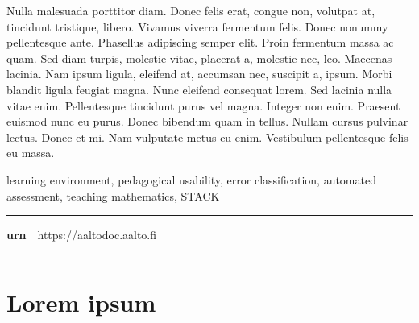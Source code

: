 \begin{spacing}{1.05}
{  Nulla malesuada porttitor diam. Donec felis erat, congue non,
  volutpat at, tincidunt tristique, libero. Vivamus viverra fermentum
  felis. Donec nonummy pellentesque ante. Phasellus adipiscing semper
  elit. Proin fermentum massa ac quam. Sed diam turpis, molestie
  vitae, placerat a, molestie nec, leo. Maecenas lacinia. Nam ipsum
  ligula, eleifend at, accumsan nec, suscipit a, ipsum. Morbi blandit
  ligula feugiat magna. Nunc eleifend consequat lorem. Sed lacinia
  nulla vitae enim. Pellentesque tincidunt purus vel magna. Integer
  non enim. Praesent euismod nunc eu purus.  Donec bibendum quam in
  tellus. Nullam cursus pulvinar lectus. Donec et mi. Nam vulputate
  metus eu enim. Vestibulum pellentesque felis eu massa.
}

\vfill

\end{spacing}
\begin{spacing}{.88}
{\parindent0pt %

\parbox[t]{123.6mm}{\raggedright\small learning environment, pedagogical usability, error classification, automated assessment, teaching mathematics, STACK}

\vspace{.5mm}\rule{\textwidth}{.75pt}

{\fontsize{10.5pt}{10.5pt}\bfseries\sffamily\lsstyle urn}~~{\small https://aaltodoc.aalto.fi}

\vspace{-2.4mm}\rule{\textwidth}{.75pt}

} %
\end{spacing}

\restoregeometry  %




\newpage

\tableofcontents


\newpage


\chapter{Lorem ipsum}

